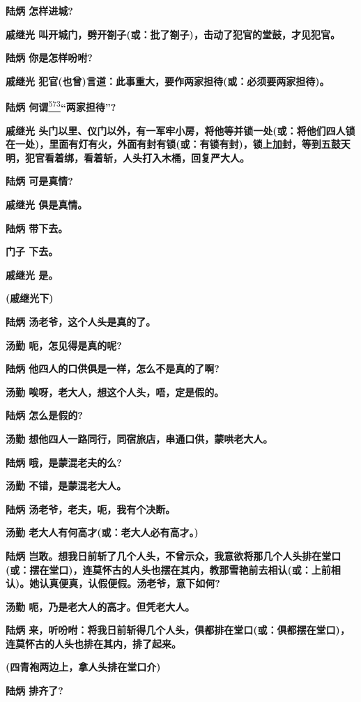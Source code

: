 \textbf{陆炳 怎样进城?}

\textbf{戚继光
叫开城门，劈开劄子(或：批了劄子)，击动了犯官的堂鼓，才见犯官。}

\textbf{陆炳 你是怎样吩咐?}

\textbf{戚继光
犯官(也曾)言道：此事重大，要作两家担待(或：必须要两家担待)。}

\textbf{陆炳
何谓}\protect\hyperlink{fn573}{\textsuperscript{573}}\textbf{``两家担待''?}

\textbf{戚继光
头门以里、仪门以外，有一军牢小房，将他等并锁一处(或：将他们四人锁在一处)，里面有灯有火，外面有封有锁(或：有锁有封)，锁上加封，等到五鼓天明，犯官看着绑，看着斩，人头打入木桶，回复严大人。}

\textbf{陆炳 可是真情?}

\textbf{戚继光 俱是真情。}

\textbf{陆炳 带下去。}

\textbf{门子 下去。}

\textbf{戚继光 是。}

\textbf{(戚继光下)}

\textbf{陆炳 汤老爷，这个人头是真的了。}

\textbf{汤勤 呃，怎见得是真的呢?}

\textbf{陆炳 他四人的口供俱是一样，怎么不是真的了啊?}

\textbf{汤勤 唉呀，老大人，想这个人头，唔，定是假的。}

\textbf{陆炳 怎么是假的?}

\textbf{汤勤 想他四人一路同行，同宿旅店，串通口供，蒙哄老大人。}

\textbf{陆炳 哦，是蒙混老夫的么?}

\textbf{汤勤 不错，是蒙混老大人。}

\textbf{陆炳 汤老爷，老夫，呃，我有个决断。}

\textbf{汤勤 老大人有何高才(或：老大人必有高才。)}

\textbf{陆炳
岂敢。想我日前斩了几个人头，不曾示众，我意欲将那几个人头排在堂口(或：摆在堂口)，连莫怀古的人头也摆在其内，教那雪艳前去相认(或：上前相认)。她认真便真，认假便假。汤老爷，意下如何?}

\textbf{汤勤 呃，乃是老大人的高才。但凭老大人。}

\textbf{陆炳
来，听吩咐：将我日前斩得几个人头，俱都排在堂口(或：俱都摆在堂口)，连莫怀古的人头也排在其内，排了起来。}

\textbf{(四青袍两边上，拿人头排在堂口介)}

\textbf{陆炳 排齐了?}

